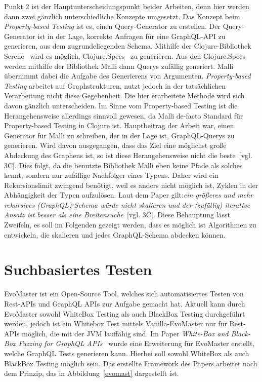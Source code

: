 Punkt 2 ist der Hauptunterscheidungspunkt beider Arbeiten, denn hier werden dann zwei gänzlich unterschiedliche Konzepte umgesetzt.
Das Konzept beim \textit{Property-based Testing} ist es, einen Query-Generator zu erstellen.
Der Query-Generator ist in der Lage, korrekte Anfragen für eine GraphQL-API zu generieren, aus dem zugrundeliegenden Schema.
Mithilfe der Clojure-Bibliothek Serene~\cite{clojureserene} wird es möglich, Clojure.Specs~\cite{clojurespec} zu generieren.
Aus den Clojure.Specs werden mithilfe der Bibliothek Malli\cite{clojuremalli} dann Querys zufällig generiert.
Malli übernimmt dabei die Aufgabe des Generierens von Argumenten.
\textit{Property-based Testing} arbeitet auf Graphstrukturen, nutzt jedoch in der tatsächlichen Verarbeitung nicht diese Gegebenheit.
Die hier erarbeitete Methode wird sich davon gänzlich unterscheiden.
Im Sinne vom Property-based Testing ist die Herangehensweise allerdings sinnvoll gewesen, da Malli\cite{clojuremalli} de-facto Standard für Property-based Testing in Clojure ist.
Hauptbeitrag der Arbeit war, einen Generator für Malli zu schreiben, der in der Lage ist, GraphQL-Querys zu generieren.
Wird davon ausgegangen, dass das Ziel eine möglichst große Abdeckung des Graphens ist, so ist diese Herangehensweise nicht die beste~\cite{property-based-testing}[vgl. 3C].
Dies folgt, da die benutzte Bibliothek Malli eben keine Pfade als solches kennt, sondern nur zufällige Nachfolger eines Typens.
Daher wird ein Rekursionslimit zwingend benötigt, weil es anders nicht möglich ist, Zyklen in der Abhängigkeit der Typen aufzulösen.
Laut dem Paper gilt:\textit{ein größeres und mehr rekursives (GraphQL)-Schema würde nicht skalieren und der (zufällig) iterative Ansatz ist besser als eine Breitensuche}~\cite{property-based-testing}[vgl. 3C].
Diese Behauptung lässt Zweifeln, es soll im Folgenden gezeigt werden, dass es möglich ist Algorithmen zu entwickeln, die skalieren und jedes GraphQL-Schema abdecken können.

\section{Suchbasiertes Testen}

EvoMaster\cite{evo-master} ist ein Open-Source Tool, welches sich automatisiertes Testen von Rest-APIs und GraphQL APIs zur Aufgabe gemacht hat.
Aktuell kann durch EvoMaster sowohl WhiteBox Testing als auch BlackBox Testing durchgeführt werden, jedoch ist ein
Whitebox Test mittels Vanilla-EvoMaster nur für Rest-APIs möglich, die mit der JVM lauffähig sind.
Im Paper \textit{White-Box and Black-Box Fuzzing for GraphQL APIs}~\cite{belhadi2022whitebox} wurde eine Erweiterung für EvoMaster
erstellt, welche GraphQL Tests generieren kann.
Hierbei soll sowohl WhiteBox als auch BlackBox Testing möglich sein.
Das erstellte Framework des Papers arbeitet nach dem Prinzip, das in Abbildung~\ref{evomast} dargestellt ist.

